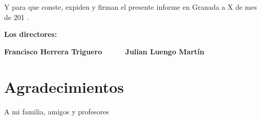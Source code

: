 \vspace{0.5cm}

Y para que conste, expiden y firman el presente informe en Granada a X de mes de 201 .

\vspace{1cm}

\textbf{Los directores:}

\vspace{5cm}

\noindent \textbf{Francisco Herrera Triguero   \ \ \ \ \ Julian Luengo Martín }

\chapter*{Agradecimientos}
\thispagestyle{empty}

       \vspace{1cm}


A mi familia, amigos y profesores

